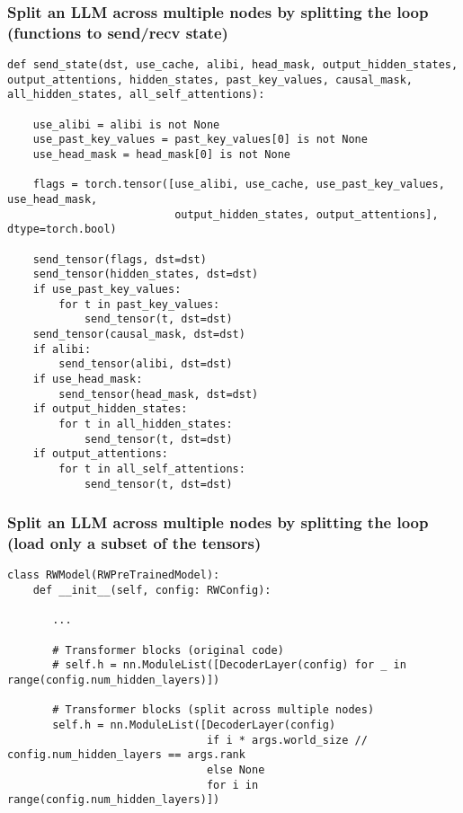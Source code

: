 \documentclass{beamer}
\begin{document}
\begin{frame}[fragile]
\frametitle{Split an LLM across multiple nodes by splitting the loop (functions to send/recv state)}
\tiny\begin{verbatim}
def send_state(dst, use_cache, alibi, head_mask, output_hidden_states, output_attentions, hidden_states, past_key_values, causal_mask, all_hidden_states, all_self_attentions):

    use_alibi = alibi is not None
    use_past_key_values = past_key_values[0] is not None
    use_head_mask = head_mask[0] is not None

    flags = torch.tensor([use_alibi, use_cache, use_past_key_values, use_head_mask,
                          output_hidden_states, output_attentions], dtype=torch.bool)

    send_tensor(flags, dst=dst)
    send_tensor(hidden_states, dst=dst)
    if use_past_key_values:
        for t in past_key_values:
            send_tensor(t, dst=dst)
    send_tensor(causal_mask, dst=dst)
    if alibi:
        send_tensor(alibi, dst=dst)
    if use_head_mask:
        send_tensor(head_mask, dst=dst)
    if output_hidden_states:
        for t in all_hidden_states:
            send_tensor(t, dst=dst)
    if output_attentions:
        for t in all_self_attentions:
            send_tensor(t, dst=dst)
\end{verbatim}
\end{frame}

\begin{frame}[fragile]
\frametitle{Split an LLM across multiple nodes by splitting the loop (load only a subset of the tensors)}
\tiny\begin{verbatim}
class RWModel(RWPreTrainedModel):
    def __init__(self, config: RWConfig):

       ...

       # Transformer blocks (original code)
       # self.h = nn.ModuleList([DecoderLayer(config) for _ in range(config.num_hidden_layers)])

       # Transformer blocks (split across multiple nodes)
       self.h = nn.ModuleList([DecoderLayer(config)
                               if i * args.world_size // config.num_hidden_layers == args.rank
                               else None
                               for i in range(config.num_hidden_layers)])
\end{verbatim}
\end{frame}
\end{document}
